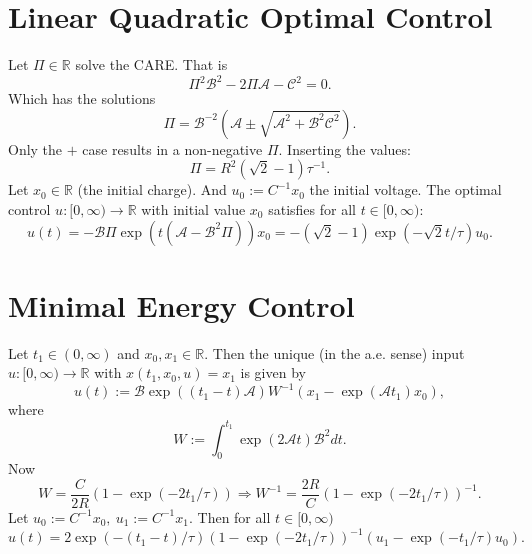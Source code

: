 \documentclass[10pt, a4paper]{article} %
\begin{document}
\section{Linear Quadratic Optimal Control}
Let $\Pi \in \mathbb{R}$ solve the CARE.
That is
\begin{equation*}
	\Pi^2 \mathcal{B}^2 - 2 \Pi \mathcal{A} - \mathcal{C}^2 =0.
\end{equation*}
Which has the solutions
\begin{equation*}
	\Pi = \mathcal{B}^{-2} ( \mathcal{A} \pm \sqrt{\mathcal{A}^2  + \mathcal{B}^2 \mathcal{C}^2 }).
\end{equation*}
Only the $+$ case results in a non-negative $\Pi$.
Inserting the values:
\begin{equation*}
	\Pi = R^2( \sqrt{2}-1) \tau^{-1}.
\end{equation*}
Let $x_0 \in \mathbb{R}$ (the initial charge).
And $ u_0 :=  C^{-1} x_0$ the initial voltage.
The optimal control $u:[0, \infty) \to \mathbb{R}$ with initial value $x_0$ satisfies for all $t\in [0,\infty)$:
\begin{equation*}
	u (t) = - \mathcal{B} \Pi \exp ( t (\mathcal{A}- \mathcal{B}^2 \Pi)) x_0 = - (\sqrt{2}-1) \exp( - \sqrt{2} t /\tau) u_0.
\end{equation*}

\section{Minimal Energy Control}
Let $t_1 \in (0, \infty)$ and $x_0 ,x_1 \in \mathbb{R}$.
Then the unique (in the a.e. sense) input $u: [0, \infty) \to \mathbb{R}$ with 
$x(t_1,x_0,u) = x_1$ is given by
\begin{equation*}
	u(t) := \mathcal{B} \exp ( (t_1-t) \mathcal{A}) W^{-1} (x_1 - \exp ( \mathcal{A} t_1) x_0),
\end{equation*}
where
\begin{equation*}
	W := \int_0^{t_1} \exp ( 2 \mathcal{A} t) \mathcal{B}^2 dt.
\end{equation*}
Now
\begin{equation*}
	W= \frac{C}{ 2R} (1-\exp (-2 t_1/\tau )) \Rightarrow W^{-1} =  \frac{2R}{C} (1 -\exp (-2t_1/\tau ))^{-1}.
\end{equation*}
Let $u_0 := C^{-1} x_0, \ u_1 := C^{-1}x_1$. Then for all $t \in [0, \infty)$
\begin{equation*}
	u(t) = 2 \exp (-(t_1 -t)/\tau)  (1 - \exp (-2t_1/\tau))^{-1} (u_1 - \exp (-t_1/\tau) u_0).
\end{equation*}
\end{document}
